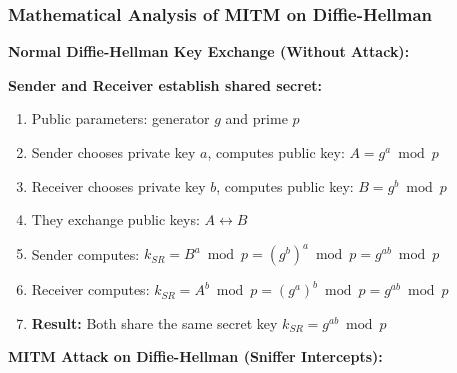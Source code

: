 \documentclass[a4paper,12pt]{extarticle}
\begin{document}
\subsubsection*{Mathematical Analysis of MITM on Diffie-Hellman}

\textbf{Normal Diffie-Hellman Key Exchange (Without Attack):}

\begin{tcolorbox}[
    enhanced,
    colback=green!5,
    colframe=green!70!black,
    boxrule=1.5pt,
    arc=3mm,
    left=10pt, right=10pt, top=10pt, bottom=10pt
]
\textbf{Sender and Receiver establish shared secret:}
\begin{enumerate}
    \item Public parameters: generator $g$ and prime $p$
    \item Sender chooses private key $a$, computes public key: $A = g^a \bmod p$
    \item Receiver chooses private key $b$, computes public key: $B = g^b \bmod p$
    \item They exchange public keys: $A \leftrightarrow B$
    \item Sender computes: $k_{SR} = B^a \bmod p = (g^b)^a \bmod p = g^{ab} \bmod p$
    \item Receiver computes: $k_{SR} = A^b \bmod p = (g^a)^b \bmod p = g^{ab} \bmod p$
    \item \textbf{Result:} Both share the same secret key $k_{SR} = g^{ab} \bmod p$
\end{enumerate}
\end{tcolorbox}

\vspace{0.3cm}

\textbf{MITM Attack on Diffie-Hellman (Sniffer Intercepts):}
\end{document}
